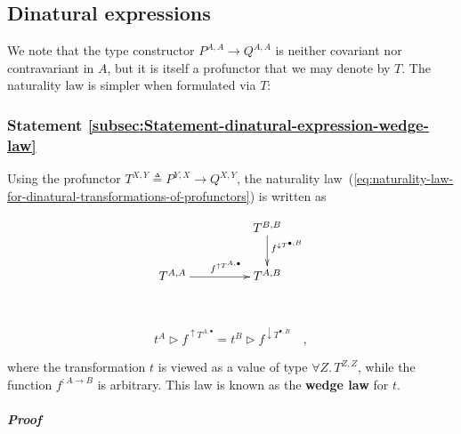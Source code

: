 \subsection{Dinatural expressions}

We note that the type constructor $P^{A,A}\rightarrow Q^{A,A}$ is
neither covariant nor contravariant in $A$, but it is itself a profunctor
that we may denote by $T$. The naturality law is simpler when formulated
via $T$:

\subsubsection{Statement \label{subsec:Statement-dinatural-expression-wedge-law}\ref{subsec:Statement-dinatural-expression-wedge-law}}

Using the profunctor $T^{X,Y}\triangleq P^{Y,X}\rightarrow Q^{X,Y}$,
the naturality law~(\ref{eq:naturality-law-for-dinatural-transformations-of-profunctors})
is written as

\begin{wrapfigure}[9]{l}{0.24\columnwidth}%
\vspace{-1.5\baselineskip}
\[
\xymatrix{\xyScaleY{2.0pc}\xyScaleX{4.0pc} & T^{B,B}\ar[d]\sp(0.37){f^{\downarrow T^{\bullet,B}}}\\
T^{A,A}\ar[r]\sp(0.5){~~~f^{\uparrow T^{A,\bullet}}} & T^{A,B}
}
\]

\vspace{-0\baselineskip}
\end{wrapfigure}%

~\vspace{-0.8\baselineskip}

\begin{equation}
t^{A}\triangleright f^{\uparrow T^{A,\bullet}}=t^{B}\triangleright f^{\downarrow T^{\bullet,B}}\quad,\label{eq:dinaturality-wedge-law-1}
\end{equation}
\vspace{-0.8\baselineskip}

\noindent where the transformation $t$ is viewed as a value of type
$\forall Z.\,T^{Z,Z}$, while the function $f^{:A\rightarrow B}$
is arbitrary. This law is known as the \textbf{wedge law}
for $t$.

\subparagraph{Proof}

